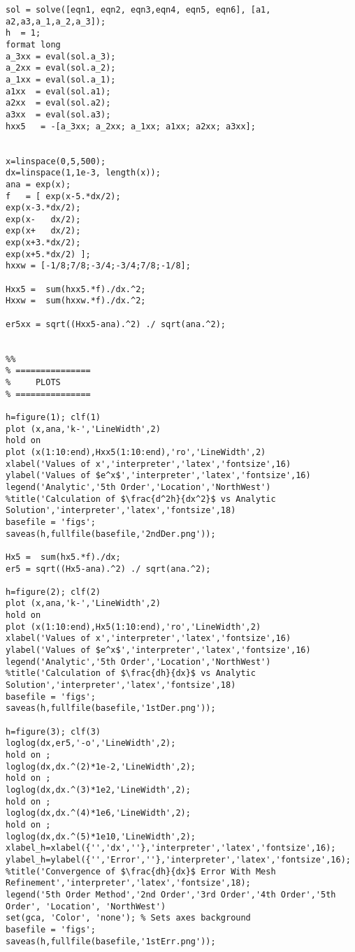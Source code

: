 \begin{verbatim}
sol = solve([eqn1, eqn2, eqn3,eqn4, eqn5, eqn6], [a1, a2,a3,a_1,a_2,a_3]);
h  = 1;
format long
a_3xx = eval(sol.a_3);
a_2xx = eval(sol.a_2);
a_1xx = eval(sol.a_1);
a1xx  = eval(sol.a1);
a2xx  = eval(sol.a2);
a3xx  = eval(sol.a3);
hxx5   = -[a_3xx; a_2xx; a_1xx; a1xx; a2xx; a3xx];


x=linspace(0,5,500);
dx=linspace(1,1e-3, length(x));
ana = exp(x);
f   = [ exp(x-5.*dx/2);
exp(x-3.*dx/2);
exp(x-   dx/2);
exp(x+   dx/2);
exp(x+3.*dx/2);
exp(x+5.*dx/2) ];
hxxw = [-1/8;7/8;-3/4;-3/4;7/8;-1/8];

Hxx5 =  sum(hxx5.*f)./dx.^2;
Hxxw =  sum(hxxw.*f)./dx.^2;

er5xx = sqrt((Hxx5-ana).^2) ./ sqrt(ana.^2);


%%
% ===============
%     PLOTS
% ===============

h=figure(1); clf(1)
plot (x,ana,'k-','LineWidth',2)
hold on
plot (x(1:10:end),Hxx5(1:10:end),'ro','LineWidth',2)
xlabel('Values of x','interpreter','latex','fontsize',16)
ylabel('Values of $e^x$','interpreter','latex','fontsize',16)
legend('Analytic','5th Order','Location','NorthWest')
%title('Calculation of $\frac{d^2h}{dx^2}$ vs Analytic Solution','interpreter','latex','fontsize',18)
basefile = 'figs';
saveas(h,fullfile(basefile,'2ndDer.png'));

Hx5 =  sum(hx5.*f)./dx;
er5 = sqrt((Hx5-ana).^2) ./ sqrt(ana.^2);

h=figure(2); clf(2)
plot (x,ana,'k-','LineWidth',2)
hold on
plot (x(1:10:end),Hx5(1:10:end),'ro','LineWidth',2)
xlabel('Values of x','interpreter','latex','fontsize',16)
ylabel('Values of $e^x$','interpreter','latex','fontsize',16)
legend('Analytic','5th Order','Location','NorthWest')
%title('Calculation of $\frac{dh}{dx}$ vs Analytic Solution','interpreter','latex','fontsize',18)
basefile = 'figs';
saveas(h,fullfile(basefile,'1stDer.png'));

h=figure(3); clf(3)
loglog(dx,er5,'-o','LineWidth',2);
hold on ;
loglog(dx,dx.^(2)*1e-2,'LineWidth',2);
hold on ;
loglog(dx,dx.^(3)*1e2,'LineWidth',2);
hold on ;
loglog(dx,dx.^(4)*1e6,'LineWidth',2);
hold on ;
loglog(dx,dx.^(5)*1e10,'LineWidth',2);
xlabel_h=xlabel({'','dx',''},'interpreter','latex','fontsize',16);
ylabel_h=ylabel({'','Error',''},'interpreter','latex','fontsize',16);
%title('Convergence of $\frac{dh}{dx}$ Error With Mesh Refinement','interpreter','latex','fontsize',18);
legend('5th Order Method','2nd Order','3rd Order','4th Order','5th Order', 'Location', 'NorthWest')
set(gca, 'Color', 'none'); % Sets axes background
basefile = 'figs';
saveas(h,fullfile(basefile,'1stErr.png'));


\end{verbatim}
